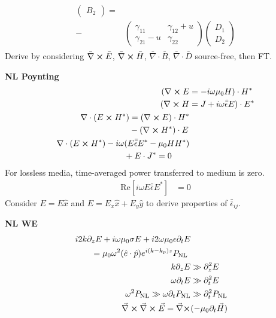 \documentclass[12pt]{article}
\begin{document}
\begin{multicols}{3}
\begin{align}
\begin{split}
\begin{pmatrix}
    B_2
  \end{pmatrix} =\\
  -&\begin{pmatrix}
    \gamma_{11} & \gamma_{12} + u\\
    \gamma_{21} - u & \gamma_{22}
  \end{pmatrix}
  \begin{pmatrix}
      D_1\\
      D_2
  \end{pmatrix}
  \end{split}
\end{align}
Derive by considering $\bar{\nabla} \cross \bar{E}$, $\bar{\nabla} \cross \bar{H}$,
$\bar{\nabla} \cdot \bar{B}$, $\bar{\nabla} \cdot \bar{D}$ source-free, then FT.

\textbf{NL Poynting}
\begin{align}
  (\nabla \cross E &= -i \omega \mu_0 H) \cdot H^{*}\\
  (\nabla \cross H &= J + i \omega \bar{\bar{\epsilon}} E) \cdot E^{*}\\
  \begin{split}
    \nabla \cdot (E \cross H^{*}) &= (\nabla \cross E) \cdot H^*\\
    &- (\nabla \cross H^{*}) \cdot E
  \end{split}\\
  \begin{split}
    \nabla \cdot (E \cross H^*) - i \omega &(E \bar{\bar{\epsilon}} E^* - \mu_0 H H^*)\\
    &+ E \cdot J^* = 0
  \end{split}
\end{align}
For lossless media, time-averaged power transferred to medium is zero.
\begin{align}
  \textrm{Re}[i\omega E \bar{\bar{\epsilon}} E^*] &= 0
\end{align}
Consider $E = E \hat{x}$ and $E = E_x \hat{x} + E_y \hat{y}$ to derive properties
of $\bar{\bar{\epsilon}}_{ij}$.

\textbf{NL WE}
\begin{align}
  \begin{split}
    i2k\partial_zE + i\omega\mu_0\sigma E &+ i2\omega\mu_0\epsilon \partial_t E\\
    = \mu_0\omega^2(\hat{e} \cdot \hat{p})&e^{i(k-k_p)z}P_{\textrm{NL}}
  \end{split}\\
  k \partial_z E &\gg \partial_z^2 E\\
  \omega \partial_t E &\gg \partial_t^2 E\\
  \omega^2 P_{\textrm{NL}} \gg \omega \partial_t P_{\textrm{NL}} &\gg \partial_t^2 P_{\textrm{NL}}\\
  \vec{\nabla} \cross \vec{\nabla} \cross \vec{E} = \vec{\nabla} \cross &(-\mu_0 \partial_t \vec{H})
\end{align}


\end{multicols}
\end{document}

